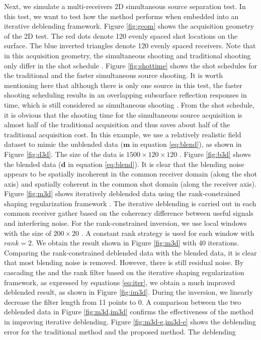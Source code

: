 Next, we simulate a multi-receivers 2D simultaneous source separation test. In this test, we want to test how the  method performs when embedded into an iterative deblending framework. Figure \ref{fig:geom} shows the acquisition geometry of the 2D test. The red dots denote 120 evenly spaced shot locations on the surface.  The blue inverted triangles denote 120 evenly spaced receivers. Note that in this acquisition geometry, the simultaneous shooting and traditional shooting only differ in the shot schedule \cite[]{abma2014}. Figure \ref{fig:shottime} shows the shot schedules for the traditional and the faster simultaneous source shooting. It is worth mentioning here that although there is only one source in this test, the faster shooting scheduling results in an overlapping subsurface reflection responses in time, which is still considered as simultaneous shooting \cite[]{abma2015}. From the shot schedule, it is obvious that the shooting time for the simultaneous source acquisition is almost half of the traditional acquisition and thus saves about half of the traditional acquisition cost. In this example, we use a relatively realistic field dataset to mimic the unblended data ($\mathbf{m}$ in equation \ref{eq:blend}), as shown in Figure \ref{fig:d3d}.  The size of the data is $1500\times 120\times120$ . Figure \ref{fig:b3d} shows the blended data ($\mathbf{d}$ in equation \ref{eq:blend}). It is clear that the blending noise appears to be spatially incoherent in the common receiver domain (along the shot axis) and spatially coherent in the common shot domain (along the receiver axis). Figure \ref{fig:m3d} shows iteratively deblended data using the rank-constrained shaping regularization framework  \cite[]{yangkang20142,shaohuan2017gji}. The iterative deblending is carried out in each common receiver gather based on the coherency difference between useful signals and interfering noise. For the rank-constrained inversion, we use local windows with the size of $200\times 20$ . A constant rank strategy is used for each window with $rank=2$. We obtain the result shown in Figure \ref{fig:m3d} with 40 iterations. Comparing the rank-constrained deblended data with the blended data, it is clear that most blending noise is removed. However, there is still  residual noise. By cascading the  and the rank filter based on the iterative shaping regularization framework, as expressed by equations \ref{eq:iter}, we obtain a much improved deblended result, as shown in Figure \ref{fig:im3d}. During the inversion, we linearly decrease the filter length from 11 points to 0. A comparison between the two deblended data in Figure \ref{fig:m3d,im3d} confirms the effectiveness of the  method in improving iterative deblending. Figure \ref{fig:m3d-e,im3d-e} shows the deblending error for the traditional method and the proposed method. The deblending 